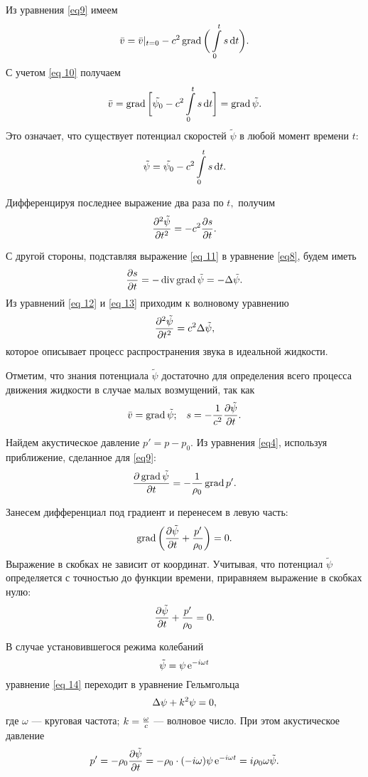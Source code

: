 Из уравнения \eqref{eq9} имеем
$$
\bar{v}=\bar{v}|_{t=0}-c^2\operatorname{grad} \bigg(\int\limits_{0}^{t} s\operatorname{d} \! t\bigg).
$$
С учетом \eqref{eq 10} получаем
\begin{equation}\label{eq 11}
\bar{v}=\operatorname{grad}\bigg[\tilde{\psi_0}-c^2\int\limits_{0}^{t} s\operatorname{d} \! t\bigg]=\operatorname{grad}\tilde{\psi}.
\end{equation}
Это означает, что существует потенциал скоростей $\tilde{\psi}$ в любой момент времени $t:$
$$
\tilde{\psi}=\tilde{\psi_0}-c^2\int\limits_{0}^{t} s\operatorname{d} \! t.
$$

Дифференцируя последнее выражение два раза по $t,$ получим
\begin{equation}\label{eq 12}
\frac{\partial^2\tilde{\psi}}{\partial t^2}=-c^2\frac{\partial s}{\partial t}.
\end{equation}

С другой стороны, подставляя выражение \eqref{eq 11} в уравнение \eqref{eq8}, будем иметь
\begin{equation}\label{eq 13}
\frac{\partial s}{\partial t}=-\operatorname{div}\operatorname{grad}\tilde{\psi}=-\Delta\tilde{\psi}.
\end{equation}
Из уравнений \eqref{eq 12} и \eqref{eq 13} приходим к волновому уравнению
\begin{equation}\label{eq 14}
\frac{\partial^2\tilde{\psi}}{\partial t^2}=c^2\Delta\tilde{\psi},
\end{equation}
которое описывает процесс распространения звука в идеальной жидкости.

Отметим, что знания потенциала $\tilde{\psi}$ достаточно для определения всего процесса движения жидкости в случае малых возмущений, так как
$$
\bar{v}=\operatorname{grad}\tilde{\psi}\text{;}\quad s=-\frac{1}{c^2}\frac{\partial\tilde{\psi}}{\partial t}.
$$

Найдем акустическое давление $p'=p-p_0$. Из уравнения \eqref{eq4}, используя приближение, сделанное для \eqref{eq9}:
$$
\frac{\partial \operatorname{grad} \tilde\psi}{\partial t} = - \frac{1}{\rho_0}\operatorname{grad} p'.
$$

Занесем дифференциал под градиент и перенесем в левую часть:
$$
\operatorname{grad} \left(\frac{\partial \tilde\psi}{\partial t} + \frac{p'}{\rho_0}\right) = 0.
$$
Выражение в скобках не зависит от координат. Учитывая, что потенциал $\tilde\psi$ определяется с точностью до функции времени, приравняем выражение в скобках нулю:
$$
\frac{\partial \tilde\psi}{\partial t} + \frac{p'}{\rho_0} = 0.
$$

В случае установившегося режима колебаний
\begin{equation}\label{eq 15}
\tilde{\psi}=\psi \operatorname{e}^{-i\omega t}
\end{equation}
уравнение \eqref{eq 14} переходит в уравнение Гельмгольца
\begin{equation}\label{eq 16}
\Delta{\psi}+k^2\psi=0,
\end{equation}
где $\omega$ --- круговая частота; $k=\frac{\omega}{c}$ --- волновое число.
При этом акустическое давление 
$$
p'=-\rho_0 \frac{\partial \tilde\psi}{\partial t}=-\rho_0 \cdot (-i \omega) \psi \operatorname{e}^{-i\omega t}=i\rho_0\omega\tilde{\psi}.
$$


